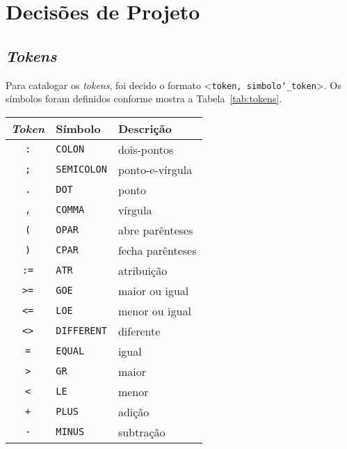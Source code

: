 \section{Decisões de Projeto \label{sec:decisoes-de-projeto}}

\subsection{\textit{Tokens}}

Para catalogar os \textit{tokens}, foi decido o formato \textless\texttt{token, simbolo\char`_token}\textgreater. Os símbolos foram definidos conforme mostra a Tabela~\ref{tab:tokens}.

\begin{table}[h]
\begin{center}
	\begin{tabular}{|c||l|l|} 
		\hline
		\textbf{\textit{Token}}      & \textbf{Símbolo}   & \textbf{Descrição}\\
		\hline
		\texttt{:}                   & \texttt{COLON}     & dois-pontos\\
		\texttt{;}                   & \texttt{SEMICOLON} & ponto-e-vírgula\\
		\texttt{.}                   & \texttt{DOT}       & ponto\\
		\texttt{,}                   & \texttt{COMMA}     & vírgula\\
		\texttt{(}                   & \texttt{OPAR}      & abre parênteses\\
		\texttt{)}                   & \texttt{CPAR}      & fecha parênteses\\
		\texttt{:=}                  & \texttt{ATR}       & atribuição\\
		\texttt{>=}                  & \texttt{GOE}       & maior ou igual\\
		\texttt{<=}                  & \texttt{LOE}       & menor ou igual\\
		\texttt{<>}                  & \texttt{DIFFERENT} & diferente\\
		\texttt{=}                   & \texttt{EQUAL}     & igual\\
		\texttt{>}                   & \texttt{GR}        & maior\\
		\texttt{<}                   & \texttt{LE}        & menor\\
		\texttt{+}                   & \texttt{PLUS}      & adição\\
		\texttt{-}                   & \texttt{MINUS}     & subtração\\

\end{tabular}
\end{center}
\end{table}
